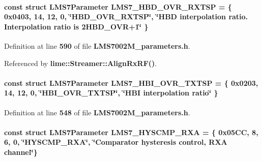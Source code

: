 \paragraph[{L\+M\+S7\+\_\+\+H\+B\+D\+\_\+\+O\+V\+R\+\_\+\+R\+X\+T\+SP}]{\setlength{\rightskip}{0pt plus 5cm}const struct {\bf L\+M\+S7\+Parameter} L\+M\+S7\+\_\+\+H\+B\+D\+\_\+\+O\+V\+R\+\_\+\+R\+X\+T\+SP = \{ 0x0403, 14, 12, 0, \char`\"{}\+H\+B\+D\+\_\+\+O\+V\+R\+\_\+\+R\+X\+T\+S\+P\char`\"{}, \char`\"{}\+H\+B\+D interpolation ratio. Interpolation ratio is 2\+H\+B\+D\+\_\+\+O\+V\+R+1\char`\"{} \}\hspace{0.3cm}{\ttfamily [static]}}\label{LMS7002M__parameters_8h_a2507d5cb1ef0eb8fb872f7b3f552710e}


Definition at line {\bf 590} of file {\bf L\+M\+S7002\+M\+\_\+parameters.\+h}.



Referenced by {\bf lime\+::\+Streamer\+::\+Align\+Rx\+R\+F()}.

\paragraph[{L\+M\+S7\+\_\+\+H\+B\+I\+\_\+\+O\+V\+R\+\_\+\+T\+X\+T\+SP}]{\setlength{\rightskip}{0pt plus 5cm}const struct {\bf L\+M\+S7\+Parameter} L\+M\+S7\+\_\+\+H\+B\+I\+\_\+\+O\+V\+R\+\_\+\+T\+X\+T\+SP = \{ 0x0203, 14, 12, 0, \char`\"{}\+H\+B\+I\+\_\+\+O\+V\+R\+\_\+\+T\+X\+T\+S\+P\char`\"{}, \char`\"{}\+H\+B\+I interpolation ratio\char`\"{} \}\hspace{0.3cm}{\ttfamily [static]}}\label{LMS7002M__parameters_8h_ae34ba4fe78b82162be27c6179212c768}


Definition at line {\bf 548} of file {\bf L\+M\+S7002\+M\+\_\+parameters.\+h}.

\paragraph[{L\+M\+S7\+\_\+\+H\+Y\+S\+C\+M\+P\+\_\+\+R\+XA}]{\setlength{\rightskip}{0pt plus 5cm}const struct {\bf L\+M\+S7\+Parameter} L\+M\+S7\+\_\+\+H\+Y\+S\+C\+M\+P\+\_\+\+R\+XA = \{ 0x05\+C\+C, 8, 6, 0, \char`\"{}\+H\+Y\+S\+C\+M\+P\+\_\+\+R\+X\+A\char`\"{}, \char`\"{}\+Comparator hysteresis control, R\+X\+A channel\char`\"{}\}\hspace{0.3cm}{\ttfamily [static]}}\label{LMS7002M__parameters_8h_a5be85bcf2ff341b41c03435d693f2e61}


